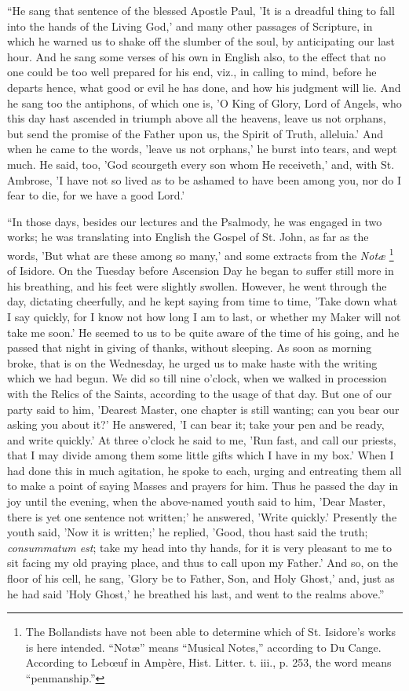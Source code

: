 ``He sang that sentence of the blessed Apostle Paul, 'It is a
dreadful thing to fall into the hands of the Living God,' and many
other passages of Scripture, in which he warned us to shake off
the slumber of the soul, by anticipating our last hour. And he sang
some verses of his own in English also, to the effect that no one
could be too well prepared for his end, viz., in calling to mind,
before he departs hence, what good or evil he has done, and how his
judgment will lie. And he sang too the antiphons, of which one is, 'O
King of Glory, Lord of Angels, who this day hast ascended in triumph
above all the heavens, leave us not orphans, but send the promise of
the Father upon us, the Spirit of Truth, alleluia.' And when he came
to the words, 'leave us not orphans,' he burst into tears, and wept
much. He said, too, 'God scourgeth every son whom He receiveth,' and,
with St. Ambrose, 'I have not so lived as to be ashamed to have been
among you, nor do I fear to die, for we have a good Lord.'

``In those days, besides our lectures and the Psalmody, he was
engaged in two works; he was translating into English the Gospel of
St. John, as far as the words, 'But what are these among so many,' and
some extracts from the \emph{Notæ} \footnote{The
Bollandists have not been able to determine which of St. Isidore's
works is here intended. ``Notæ'' means ``Musical
Notes,'' according to Du Cange. According to Lebœuf in Ampère,
Hist. Litter. t. iii., p. 253, the word means ``penmanship.''} of Isidore. On the Tuesday before Ascension Day he began to
suffer still more in his breathing, and his feet were slightly
swollen. However, he went through the day, dictating cheerfully, and
he kept saying from time to time, 'Take down what I say quickly, for I
know not how long I am to last, or whether my Maker will not take me
soon.' He seemed to us to be quite aware of the time of his going, and
he passed that night in giving of thanks, without sleeping. As soon as
morning broke, that is on the Wednesday, he urged us to make
haste with the writing which we had begun. We did so till nine o'clock,
when we walked in procession with the Relics of the Saints, according
to the usage of that day. But one of our party said to him, 'Dearest
Master, one chapter is still wanting; can you bear our asking you
about it?' He answered, 'I can bear it; take your pen and be ready,
and write quickly.' At three o'clock he said to me, 'Run fast, and
call our priests, that I may divide among them some little gifts which
I have in my box.' When I had done this in much agitation, he spoke to
each, urging and entreating them all to make a point of saying Masses
and prayers for him. Thus he passed the day in joy until the evening,
when the above-named youth said to him, 'Dear Master, there is yet one
sentence not written;' he answered, 'Write quickly.' Presently the
youth said, 'Now it is written;' he replied, 'Good, thou hast said the
truth; \emph{consummatum est}; take my head into thy hands, for it is
very pleasant to me to sit facing my old praying place, and thus to
call upon my Father.' And so, on the floor of his cell, he sang,
'Glory be to Father, Son, and Holy Ghost,' and, just as he had said
'Holy Ghost,' he breathed his last, and went to the realms
above.''

